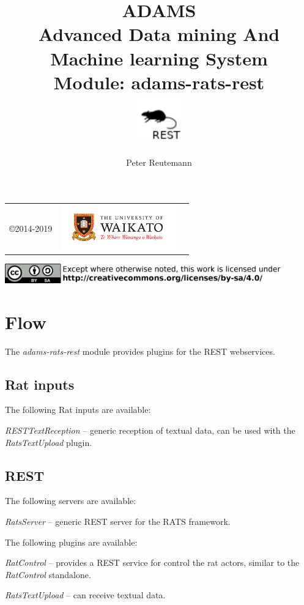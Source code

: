 \documentclass[a4paper]{book}
\title{
  \textbf{ADAMS} \\
  {\Large \textbf{A}dvanced \textbf{D}ata mining \textbf{A}nd \textbf{M}achine
  learning \textbf{S}ystem} \\
  {\Large Module: adams-rats-rest} \\
  \vspace{1cm}
  \includegraphics[width=2cm]{images/rats-rest-module.png} \\
}
\author{
  Peter Reutemann
}
\begin{document}
\begin{titlepage}
\maketitle

\thispagestyle{empty}
\center
\begin{table}[b]
	\begin{tabular}{c l l}
		\parbox[c][2cm]{2cm}{\copyright 2014-2019} &
		\parbox[c][2cm]{5cm}{\includegraphics[width=5cm]{images/coat_of_arms.pdf}}
	\end{tabular}
	\includegraphics[width=12cm]{images/cc.png} \\
\end{table}

\end{titlepage}

\tableofcontents


\chapter{Flow}
The \textit{adams-rats-rest} module provides plugins for the REST
webservices\cite{rest}.

\section{Rat inputs}
The following Rat inputs are available:
\begin{tight_itemize}
  \item \textit{RESTTextReception} -- generic reception of textual data, can be used with the \textit{RatsTextUpload} plugin.
\end{tight_itemize}

\section{REST}
The following servers are available:
\begin{tight_itemize}
  \item \textit{RatsServer} -- generic REST server for the RATS framework.
\end{tight_itemize}
The following plugins are available:
\begin{tight_itemize}
  \item \textit{RatControl} -- provides a REST service for control the rat actors, similar to the \textit{RatControl} standalone.
  \item \textit{RatsTextUpload} -- can receive textual data.
\end{tight_itemize}


\end{document}
